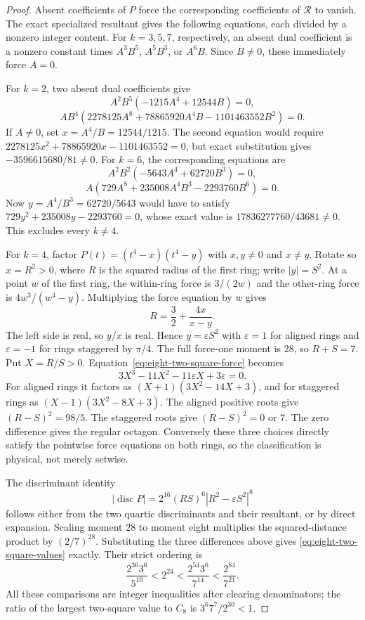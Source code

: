 \documentclass[11pt]{article}
\theoremstyle{remark}
\numberwithin{equation}{section}
\begin{document}
\begin{proof}
Absent coefficients of $P$ force the corresponding coefficients of
$\mathcal R$ to vanish. The exact specialized resultant gives the
following equations, each divided by a nonzero integer content.
For $k=3,5,7$, respectively, an absent dual coefficient is a nonzero
constant times $A^3B^5$, $A^5B^3$, or $A^6B$.
Since $B\ne0$, these immediately force $A=0$.

For $k=2$, two absent dual coefficients give
\[
 A^2B^5(-1215A^4+12544B)=0,
\]
\[
 AB^4(2278125A^8+78865920A^4B-1101463552B^2)=0.
\]
If $A\ne0$, set $x=A^4/B=12544/1215$. The second equation would
require $2278125x^2+78865920x-1101463552=0$, but exact substitution
gives $-3596615680/81\ne0$.
For $k=6$, the corresponding equations are
\[
 A^2B^2(-5643A^4+62720B^3)=0,
\]
\[
 A(729A^8+235008A^4B^3-2293760B^6)=0.
\]
Now $y=A^4/B^3=62720/5643$ would have to satisfy
$729y^2+235008y-2293760=0$, whose exact value is
$17836277760/43681\ne0$. This excludes every $k\ne4$.

For $k=4$, factor $P(t)=(t^4-x)(t^4-y)$ with $x,y\ne0$ and
$x\ne y$. Rotate so $x=R^2>0$, where $R$ is the squared radius
of the first ring; write $|y|=S^2$. At a point $w$ of the first ring,
the within-ring force is $3/(2w)$ and the other-ring force is
$4w^3/(w^4-y)$. Multiplying the force equation by $w$ gives
\begin{equation}\label{eq:eight-two-square-force}
 R=\frac32+\frac{4x}{x-y}.
\end{equation}
The left side is real, so $y/x$ is real. Hence
$y=\varepsilon S^2$ with $\varepsilon=1$ for aligned rings and
$\varepsilon=-1$ for rings staggered by $\pi/4$.
The full force-one moment is $28$, so $R+S=7$.
Put $X=R/S>0$. Equation~\eqref{eq:eight-two-square-force} becomes
\[
 3X^3-11X^2-11\varepsilon X+3\varepsilon=0.
\]
For aligned rings it factors as
$(X+1)(3X^2-14X+3)$, and for staggered rings as
$(X-1)(3X^2-8X+3)$.
The aligned positive roots give $(R-S)^2=98/5$.
The staggered roots give $(R-S)^2=0$ or $7$.
The zero difference gives the regular octagon. Conversely these
three choices directly satisfy the pointwise force equations on
both rings, so the classification is physical, not merely setwise.

The discriminant identity
\[
 |\operatorname{disc}P|
 =2^{16}(RS)^6|R^2-\varepsilon S^2|^8
\]
follows either from the two quartic discriminants and their resultant,
or by direct expansion. Scaling moment $28$ to moment eight multiplies
the squared-distance product by $(2/7)^{28}$.
Substituting the three differences above gives
\eqref{eq:eight-two-square-values} exactly. Their strict ordering is
\[
 \frac{2^{36}3^6}{5^{10}}<2^{24}
 <\frac{2^{54}3^6}{7^{14}}<\frac{2^{84}}{7^{21}}.
\]
All these comparisons are integer inequalities after clearing
denominators; the ratio of the largest two-square value to $C_8$ is
$3^6 7^7/2^{30}<1$.
\end{proof}
\end{document}
